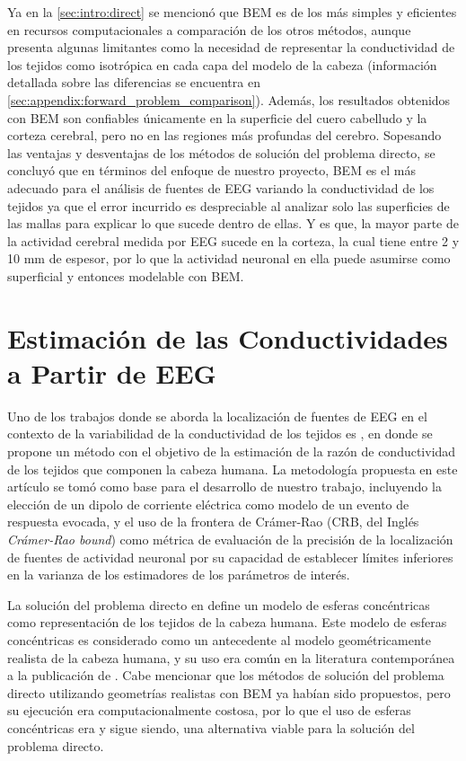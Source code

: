 Ya en la \cref{sec:intro:direct} se mencionó que BEM es de los más simples y eficientes en recursos computacionales a comparación de los otros métodos, aunque presenta algunas limitantes como la necesidad de representar la conductividad de los tejidos como isotrópica en cada capa del modelo de la cabeza (información detallada sobre las diferencias se encuentra en \cref{sec:appendix:forward_problem_comparison}).
Además, los resultados obtenidos con BEM son confiables únicamente en la superficie del cuero cabelludo y la corteza cerebral, pero no en las regiones más profundas del cerebro. 
Sopesando las ventajas y desventajas de los métodos de solución del problema directo, se concluyó que en términos del enfoque de nuestro proyecto, BEM es el más adecuado para el análisis de fuentes de EEG variando la conductividad de los tejidos ya que el error incurrido es despreciable al analizar solo las superficies de las mallas para explicar lo que sucede dentro de ellas. 
Y es que, la mayor parte de la actividad cerebral medida por EEG sucede en la corteza, la cual tiene entre 2 y 10 mm de espesor, por lo que la actividad neuronal en ella puede asumirse como superficial y entonces modelable con BEM.

\section{Estimación de las Conductividades a Partir de EEG}
\label{sec:related:gutierrez}

Uno de los trabajos donde se aborda la localización de fuentes de EEG en el contexto de la variabilidad de la conductividad de los tejidos es \cite{Gutierrez2004}, en donde se propone un método con el objetivo de la estimación de la razón de conductividad de los tejidos que componen la cabeza humana.
La metodología propuesta en este artículo se tomó como base para el desarrollo de nuestro trabajo, incluyendo la elección de un dipolo de corriente eléctrica como modelo de un evento de respuesta evocada, y el uso de la frontera de Crámer-Rao (CRB, del Inglés \emph{Crámer-Rao bound}) como métrica de evaluación de la precisión de la localización de fuentes de actividad neuronal por su capacidad de establecer límites inferiores en la varianza de los estimadores de los parámetros de interés.

La solución del problema directo en \cite{Gutierrez2004} define un modelo de esferas concéntricas como representación de los tejidos de la cabeza humana. 
Este modelo de esferas concéntricas es considerado como un antecedente al modelo geométricamente realista de la cabeza humana, y su uso era común en la literatura contemporánea a la publicación de \cite{Gutierrez2004}.
Cabe mencionar que los métodos de solución del problema directo utilizando geometrías realistas con BEM ya habían sido propuestos, pero su ejecución era computacionalmente costosa, por lo que el uso de esferas concéntricas era y sigue siendo, una alternativa viable para la solución del problema directo.

